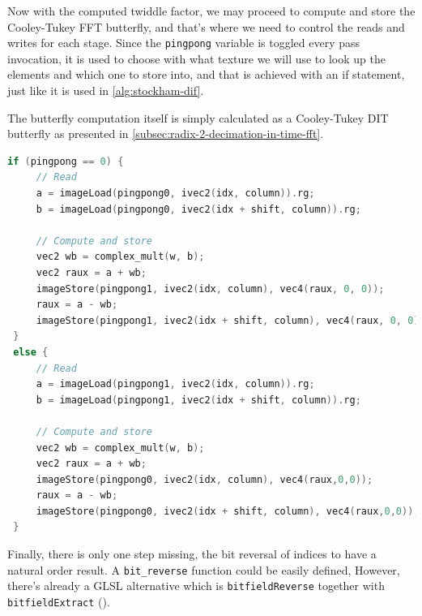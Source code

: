 \documentclass[
  oneside,
  11pt, a4paper,
  footinclude=true,
  headinclude=true,
  cleardoublepage=empty
]{scrbook}
\begin{document}
Now with the computed twiddle factor, we may proceed to compute and store the Cooley-Tukey FFT butterfly, and that's where we need to control the reads and writes for each stage. Since the \texttt{pingpong} variable is toggled every pass invocation, it is used to choose with what texture we will use to look up the elements and which one to store into, and that is achieved with an if statement, just like it is used in \autoref{alg:stockham-dif}.

The butterfly computation itself is simply calculated as a Cooley-Tukey DIT butterfly as presented in \autoref{subsec:radix-2-decimation-in-time-fft}.

\begin{lstlisting}[language=C,caption={Computation of the Cooley-Tukey butterfly}]
 if (pingpong == 0) {
     // Read
     a = imageLoad(pingpong0, ivec2(idx, column)).rg;
     b = imageLoad(pingpong0, ivec2(idx + shift, column)).rg;

     // Compute and store
     vec2 wb = complex_mult(w, b);
     vec2 raux = a + wb;
     imageStore(pingpong1, ivec2(idx, column), vec4(raux, 0, 0));
     raux = a - wb;
     imageStore(pingpong1, ivec2(idx + shift, column), vec4(raux, 0, 0));
 }
 else {
     // Read
     a = imageLoad(pingpong1, ivec2(idx, column)).rg;
     b = imageLoad(pingpong1, ivec2(idx + shift, column)).rg;
     
     // Compute and store
     vec2 wb = complex_mult(w, b);
     vec2 raux = a + wb;
     imageStore(pingpong0, ivec2(idx, column), vec4(raux,0,0));    
     raux = a - wb;
     imageStore(pingpong0, ivec2(idx + shift, column), vec4(raux,0,0));
 }
\end{lstlisting}

Finally, there is only one step missing, the bit reversal of indices to have a natural order result. A \texttt{bit\_reverse} function could be easily defined, However, there's already a GLSL alternative which is \texttt{bitfieldReverse} together with \texttt{bitfieldExtract} (\cite{kessenich4opengl}).

\end{document}
